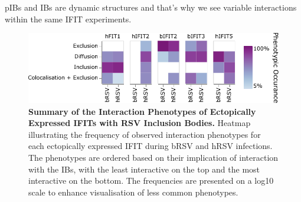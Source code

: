 pIBs and IBs are dynamic structures and that's why we see variable interactions within the same IFIT experiments.

\begin{figure}
    \centering
    \includegraphics[width=1\linewidth]{09. Chapter 4/Figs/heatmap-infection-transfection.pdf}
    \caption[Summary of the Interaction Phenotypes of Ectopically Expressed IFITs with RSV Inclusion Bodies.]{\textbf{Summary of the Interaction Phenotypes of Ectopically Expressed IFITs with RSV Inclusion Bodies.} Heatmap illustrating the frequency of observed interaction phenotypes for each ectopically expressed IFIT during bRSV and hRSV infections. The phenotypes are ordered based on their implication of interaction with the IBs, with the least interactive on the top and the most interactive on the bottom. The frequencies are presented on a log10 scale to enhance visualisation of less common phenotypes.}
    \label{fig:Summary of the Interaction Phenotypes of Ectopically Expressed IFITs with RSV Inclusion Bodies}
\end{figure}


